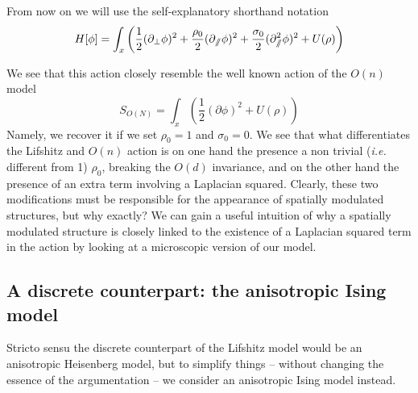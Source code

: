 From now on we will use the self-explanatory shorthand notation
\begin{equation}
H[\phi] = \int_x \left( \frac{1}{2}(\partial_{\perp} \phi)^2 + \frac{\rho_0}{2}(\partial_{\sslash} \phi)^2 + \frac{\sigma_0}{2} (\partial_{\sslash}^2 \phi)^2 + U(\rho) \right)
\end{equation}

We see that this action closely resemble the well known action of the $O(n)$ model
\begin{equation}
S_{O(N)} = \int_x \left( \frac{1}{2}(\partial \phi)^2 + U(\rho) \right)
\end{equation}
Namely, we recover it if we set $\rho_0 = 1$ and $\sigma_0 = 0$. We see that what differentiates the Lifshitz and $O(n)$ action is on one hand the presence a non trivial (\textit{i.e.} different from 1) $\rho_0$, breaking the $O(d)$ invariance, and on the other hand the presence of an extra term involving a Laplacian squared. Clearly, these two modifications must be responsible for the appearance of spatially modulated structures, but why exactly? 
We can gain a useful intuition of why a spatially modulated structure is closely linked to the existence of a Laplacian squared term in the action by looking at a microscopic version of our model. 

\subsection{A discrete counterpart: the anisotropic Ising model}

Stricto sensu the discrete counterpart of the Lifshitz model would be an anisotropic Heisenberg model, but to simplify things -- without changing the essence of the argumentation -- we consider an anisotropic Ising model instead.

